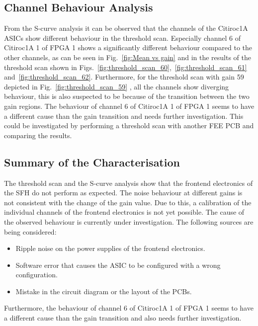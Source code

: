     \subsection{Channel Behaviour Analysis}
    From the S-curve analysis it can be observed that the channels of the Citiroc1A ASICs show different behaviour in the threshold scan.
    \newline
    Especially channel 6 of Citiroc1A 1 of FPGA 1 shows a significantly different behaviour compared to the other channels,
    as can be seen in Fig.~\ref{fig:Mean vs gain} and in the results of the threshold scan shown in Figs.~\ref{fig:threshold_scan_60},~\ref{fig:threshold_scan_61} and~\ref{fig:threshold_scan_62}.
    \newline
    Furthermore, for the threshold scan with gain 59 depicted in Fig.~\ref{fig:threshold_scan_59} , all the channels show diverging behaviour, this is also suspected to be because of the transition between the two gain regions.
    \newline
    The behaviour of channel 6 of Citiroc1A 1 of FPGA 1 seems to have a different cause than the gain transition and needs further investigation.
    This could be investigated by performing a threshold scan with another FEE PCB and comparing the results.
    \subsection{Summary of the Characterisation}
    The threshold scan and the S-curve analysis show that the frontend electronics of the SFH do not perform as expected.
    The noise behaviour at different gains is not consistent with the change of the gain value.
    \newline
    Due to this, a calibration of the individual channels of the frontend electronics is not yet possible.
    The cause of the observed behaviour is currently under investigation. The following sources are being considered:
    \begin{itemize}
        \item Ripple noise on the power supplies of the frontend electronics.
        \item Software error that causes the ASIC to be configured with a wrong configuration.
        \item Mistake in the circuit diagram or the layout of the PCBs. 
    \end{itemize}
    Furthermore, the behaviour of channel 6 of Citiroc1A 1 of FPGA 1 seems to have a different cause than the gain transition and also needs further investigation.
    
    

     
